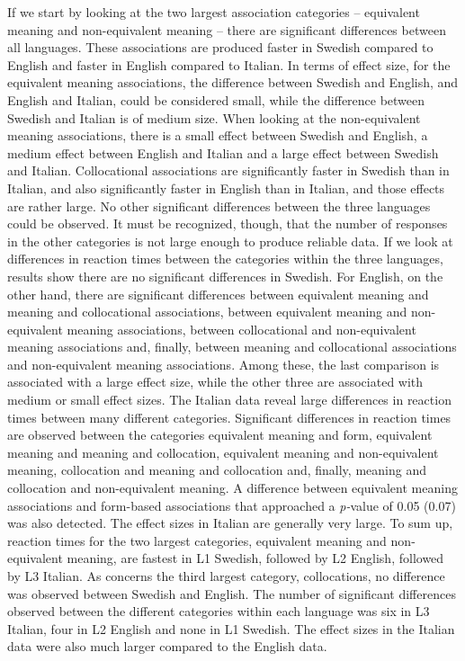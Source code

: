 \documentclass[output=paper,colorlinks,citecolor=brown,nonflat]{langsci/langscibook}
\begin{document}
If we start by looking at the two largest association categories – equivalent meaning and non-equivalent meaning – there are significant differences between all languages. These associations are produced faster in Swedish compared to English and faster in English compared to Italian. In terms of effect size, for the equivalent meaning associations, the difference between Swedish and English, and English and Italian, could be considered small, while the difference between Swedish and Italian is of medium size. When looking at the non-equivalent meaning associations, there is a small effect between Swedish and English, a medium effect between English and Italian and a large effect between Swedish and Italian. Collocational associations are significantly faster in Swedish than in Italian, and also significantly faster in English than in Italian, and those effects are rather large. No other significant differences between the three languages could be observed. It must be recognized, though, that the number of responses in the other categories is not large enough to produce reliable data. If we look at differences in reaction times between the categories within the three languages, results show there are no significant differences in Swedish. For English, on the other hand, there are significant differences between equivalent meaning and meaning and collocational associations, between equivalent meaning and non-equivalent meaning associations, between collocational and non-equivalent meaning associations and, finally, between meaning and collocational associations and non-equivalent meaning associations. Among these, the last comparison is associated with a large effect size, while the other three are associated with medium or small effect sizes. The Italian data reveal large differences in reaction times between many different categories. Significant differences in reaction times are observed between the categories equivalent meaning and form, equivalent meaning and meaning and collocation, equivalent meaning and non-equivalent meaning, collocation and meaning and collocation and, finally, meaning and collocation and non-equivalent meaning. A difference between equivalent meaning associations and form-based associations that approached a \textit{p-}value of 0.05 (0.07) was also detected.  The effect sizes in Italian are generally very large. To sum up, reaction times for the two largest categories, equivalent meaning and non-equivalent meaning, are fastest in L1 Swedish, followed by L2 English, followed by L3 Italian. As concerns the third largest category, collocations, no difference was observed between Swedish and English. The number of significant differences observed between the different categories within each language was six in L3 Italian, four in L2 English and none in L1 Swedish. The effect sizes in the Italian data were also much larger compared to the English data.
\end{document}
